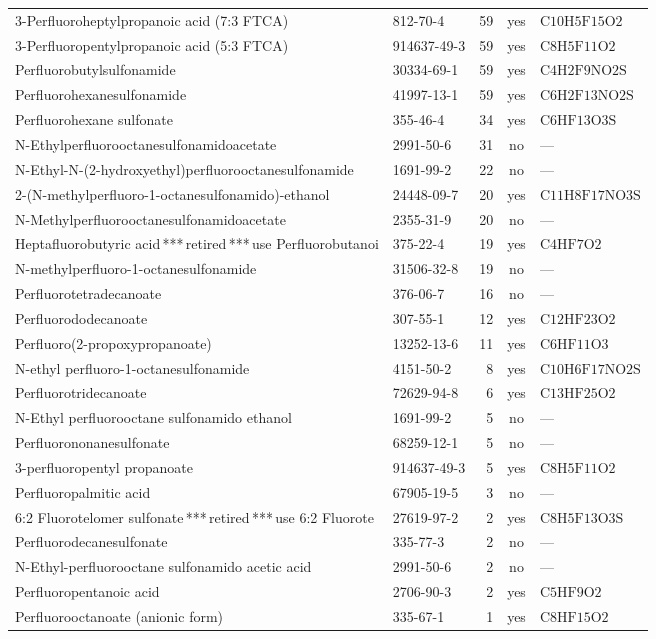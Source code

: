 \begin{longtable}{@{}p{66mm} l r c l@{}}
3-Perfluoroheptylpropanoic acid (7:3 FTCA) & 812-70-4 & 59 & yes & $\mathrm{C10H5F15O2}$ \\
3-Perfluoropentylpropanoic acid (5:3 FTCA) & 914637-49-3 & 59 & yes & $\mathrm{C8H5F11O2}$ \\
Perfluorobutylsulfonamide & 30334-69-1 & 59 & yes & $\mathrm{C4H2F9NO2S}$ \\
Perfluorohexanesulfonamide & 41997-13-1 & 59 & yes & $\mathrm{C6H2F13NO2S}$ \\
Perfluorohexane sulfonate & 355-46-4 & 34 & yes & $\mathrm{C6HF13O3S}$ \\
N-Ethylperfluorooctanesulfonamidoacetate & 2991-50-6 & 31 & no & --- \\
N-Ethyl-N-(2-hydroxyethyl)perfluorooctanesulfonamide & 1691-99-2 & 22 & no & --- \\
2-(N-methylperfluoro-1-octanesulfonamido)-ethanol & 24448-09-7 & 20 & yes & $\mathrm{C11H8F17NO3S}$ \\
N-Methylperfluorooctanesulfonamidoacetate & 2355-31-9 & 20 & no & --- \\
Heptafluorobutyric acid\,***\,retired\,***\,use Perfluorobutanoi & 375-22-4 & 19 & yes & $\mathrm{C4HF7O2}$ \\
N-methylperfluoro-1-octanesulfonamide & 31506-32-8 & 19 & no & --- \\
Perfluorotetradecanoate & 376-06-7 & 16 & no & --- \\
Perfluorododecanoate & 307-55-1 & 12 & yes & $\mathrm{C12HF23O2}$ \\
Perfluoro(2-propoxypropanoate) & 13252-13-6 & 11 & yes & $\mathrm{C6HF11O3}$ \\
N-ethyl perfluoro-1-octanesulfonamide & 4151-50-2 & 8 & yes & $\mathrm{C10H6F17NO2S}$ \\
Perfluorotridecanoate & 72629-94-8 & 6 & yes & $\mathrm{C13HF25O2}$ \\
N-Ethyl perfluorooctane sulfonamido ethanol & 1691-99-2 & 5 & no & --- \\
Perfluorononanesulfonate & 68259-12-1 & 5 & no & --- \\
3-perfluoropentyl propanoate & 914637-49-3 & 5 & yes & $\mathrm{C8H5F11O2}$ \\
Perfluoropalmitic acid & 67905-19-5 & 3 & no & --- \\
6:2 Fluorotelomer sulfonate\,***\,retired\,***\,use 6:2 Fluorote & 27619-97-2 & 2 & yes & $\mathrm{C8H5F13O3S}$ \\
Perfluorodecanesulfonate & 335-77-3 & 2 & no & --- \\
N-Ethyl-perfluorooctane sulfonamido acetic acid & 2991-50-6 & 2 & no & --- \\
Perfluoropentanoic acid & 2706-90-3 & 2 & yes & $\mathrm{C5HF9O2}$ \\
Perfluorooctanoate (anionic form) & 335-67-1 & 1 & yes & $\mathrm{C8HF15O2}$ \\
\bottomrule
\end{longtable}
